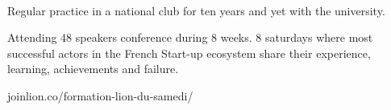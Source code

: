 \documentclass[10pt,a4paper,ragged2e]{altacv}
\begin{document}
\begin{paracol}{2}
\\


\divider

\divider


\medskip


Regular practice in a national club for ten years and yet with the university.

\divider

Attending 48 speakers conference during 8 weeks. 8 saturdays where most successful actors in the French Start-up ecosystem share their experience, learning, achievements and failure.

\Mundus joinlion.co/formation-lion-du-samedi/










\end{paracol}
\end{document}

